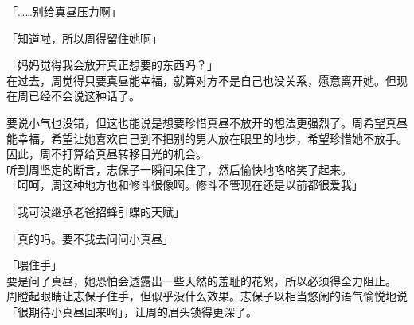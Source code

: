 「……别给真昼压力啊」

「知道啦，所以周得留住她啊」

「妈妈觉得我会放开真正想要的东西吗？」\\

在过去，周觉得只要真昼能幸福，就算对方不是自己也没关系，愿意离开她。但现在周已经不会说这种话了。

要说小气也没错，但这也能说是想要珍惜真昼不放开的想法更强烈了。周希望真昼能幸福，希望让她喜欢自己到不把别的男人放在眼里的地步，希望珍惜她不放手。\\

因此，周不打算给真昼转移目光的机会。\\

听到周坚定的断言，志保子一瞬间呆住了，然后愉快地咯咯笑了起来。\\

「呵呵，周这种地方也和修斗很像啊。修斗不管现在还是以前都很爱我」

「我可没继承老爸招蜂引蝶的天赋」

「真的吗。要不我去问问小真昼」

「喂住手」\\

要是问了真昼，她恐怕会透露出一些天然的羞耻的花絮，所以必须得全力阻止。\\

周瞪起眼睛让志保子住手，但似乎没什么效果。志保子以相当悠闲的语气愉悦地说「很期待小真昼回来啊」，让周的眉头锁得更深了。
